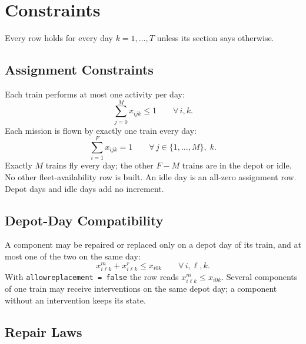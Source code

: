 \documentclass[11pt,a4paper]{article}
\theoremstyle{plain}
\theoremstyle{definition}
\renewcommand{\_}{\textunderscore\allowbreak{}}
\begin{document}
\section{Constraints}
\label{sec:constraints}

Every row holds for every day $k = 1, \ldots, T$ unless its section says otherwise.

\subsection{Assignment Constraints}
\label{sec:assignment}

Each train performs at most one activity per day:
\begin{equation}
  \sum_{j=0}^{M} x_{ijk} \leq 1 \qquad \forall\, i, k .
  \label{eq:a_one_activity}
\end{equation}
Each mission is flown by exactly one train every day:
\begin{equation}
  \sum_{i=1}^{F} x_{ijk} = 1 \qquad \forall\, j \in \{1, \ldots, M\},\; k .
  \label{eq:a_coverage}
\end{equation}
Exactly $M$ trains fly every day; the other $F - M$ trains are in the depot or idle.
No other fleet-availability row is built. An idle day is an all-zero assignment row.
Depot days and idle days add no increment.

\subsection{Depot-Day Compatibility}
\label{sec:depot}

A component may be repaired or replaced only on a depot day of its train, and at most
one of the two on the same day:
\begin{equation}
  x^m_{i\ell k} + x^r_{i\ell k} \leq x_{i0k} \qquad \forall\, i, \ell, k .
  \label{eq:a_depot}
\end{equation}
With \texttt{allow\_replacement = false} the row reads $x^m_{i\ell k} \leq x_{i0k}$.
Several components of one train may receive interventions on the same depot day; a
component without an intervention keeps its state.

\subsection{Repair Laws}
\label{sec:repair_laws}
\end{document}
